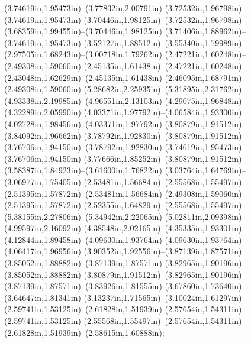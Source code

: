 (3.74619in,1.95473in)--(3.77832in,2.00791in) (3.72532in,1.96798in)--(3.74619in,1.95473in) (3.70446in,1.98125in)--(3.72532in,1.96798in) (3.68359in,1.99455in)--(3.70446in,1.98125in) (3.71406in,1.88962in)--(3.74619in,1.95473in) (3.52127in,1.88512in)--(3.55340in,1.79989in) (2.97505in,1.68243in)--(3.00718in,1.79262in) (2.47221in,1.60248in)--(2.49308in,1.59060in) (2.45135in,1.61438in)--(2.47221in,1.60248in) (2.43048in,1.62629in)--(2.45135in,1.61438in) (2.46095in,1.68791in)--(2.49308in,1.59060in) (5.28682in,2.25935in)--(5.31895in,2.31762in) (4.93338in,2.19985in)--(4.96551in,2.13103in) (4.29075in,1.96848in)--(4.32289in,2.05990in) (4.03371in,1.97792in)--(4.06584in,1.93300in) (4.02728in,1.98456in)--(4.03371in,1.97792in) (3.80879in,1.91512in)--(3.84092in,1.96662in) (3.78792in,1.92830in)--(3.80879in,1.91512in) (3.76706in,1.94150in)--(3.78792in,1.92830in) (3.74619in,1.95473in)--(3.76706in,1.94150in) (3.77666in,1.85252in)--(3.80879in,1.91512in) (3.58387in,1.84923in)--(3.61600in,1.76822in) (3.03764in,1.64769in)--(3.06977in,1.75405in) (2.53481in,1.56684in)--(2.55568in,1.55497in) (2.51395in,1.57872in)--(2.53481in,1.56684in) (2.49308in,1.59060in)--(2.51395in,1.57872in) (2.52355in,1.64829in)--(2.55568in,1.55497in) (5.38155in,2.27806in)--(5.34942in,2.22065in) (5.02811in,2.09398in)--(4.99597in,2.16092in) (4.38548in,2.02165in)--(4.35335in,1.93301in) (4.12844in,1.89458in)--(4.09630in,1.93764in) (4.09630in,1.93764in)--(4.06417in,1.96956in) (3.90352in,1.92556in)--(3.87139in,1.87571in) (3.85052in,1.88882in)--(3.87139in,1.87571in) (3.82965in,1.90196in)--(3.85052in,1.88882in) (3.80879in,1.91512in)--(3.82965in,1.90196in) (3.87139in,1.87571in)--(3.83926in,1.81555in) (3.67860in,1.73640in)--(3.64647in,1.81341in) (3.13237in,1.71565in)--(3.10024in,1.61297in) (2.59741in,1.53125in)--(2.61828in,1.51939in) (2.57654in,1.54311in)--(2.59741in,1.53125in) (2.55568in,1.55497in)--(2.57654in,1.54311in) (2.61828in,1.51939in)--(2.58615in,1.60888in);
